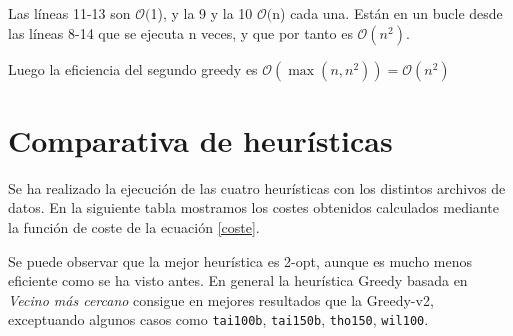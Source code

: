 \documentclass[a4paper, 11pt]{article} %
\newcommand{\ef}[1]{$\mathcal{O}#1$}
\begin{document}
Las líneas 11-13 son \ef(1), y la 9 y la 10 \ef(n) cada una. Están en un bucle desde
las líneas 8-14 que se ejecuta n veces, y que por tanto es $\mathcal{O}(n^2)$.

Luego la eficiencia del segundo greedy es $\mathcal{O}(\max(n,n^2))=\mathcal{O}(n^2)$ 

\section{Comparativa de heurísticas}
Se ha realizado la ejecución de las cuatro heurísticas con los distintos archivos de datos. En la siguiente tabla mostramos los costes obtenidos calculados mediante la función de coste de la ecuación \ref{coste}.

Se puede observar que la mejor heurística es 2-opt, aunque es mucho menos eficiente como se ha visto antes. En general la heurística Greedy basada en \textit{Vecino más cercano} consigue en mejores resultados que la Greedy-v2, exceptuando algunos casos como \texttt{tai100b}, \texttt{tai150b}, \texttt{tho150}, \texttt{wil100}.


\end{document}
